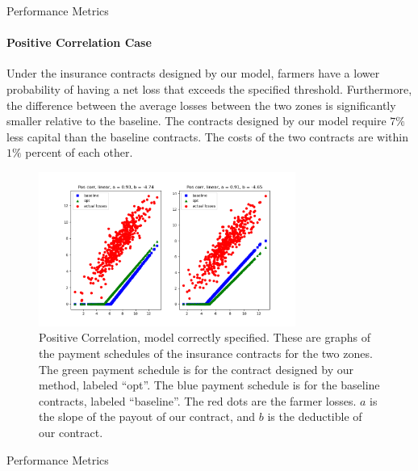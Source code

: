 \documentclass[11pt]{article}
\begin{document}
      \begin{table}[H]
          \centering
          \small
          \caption{Performance Metrics}
          
      \end{table}
      \FloatBarrier


      \paragraph{Positive Correlation Case} Under the insurance contracts designed by our model, farmers have a lower probability of having a net loss that exceeds the specified threshold. Furthermore, the difference between the average losses between the two zones is significantly smaller relative to the baseline. The contracts designed by our model require $7\%$ less capital than the baseline contracts. The costs of the two contracts are within $1\%$ percent of each other. 
      \begin{figure}[H]
          \centering
          \includegraphics[width=0.75\textwidth]{../../output/figures/Exploration/pos_correlation_linear.png}
          \caption{Positive Correlation, model correctly specified. These are graphs of the payment schedules of the insurance contracts for the two zones. The green payment schedule is for the contract designed by our method, labeled ``opt''. The blue payment schedule is for the baseline contracts, labeled ``baseline''. The red dots are the farmer losses. $a$ is the slope of the payout of our contract, and $b$ is the deductible of our contract.}
      \end{figure}

      \begin{table}[H]
          \centering
          \small
          \caption{Performance Metrics}
          
      \end{table}
      \FloatBarrier
\end{document}
